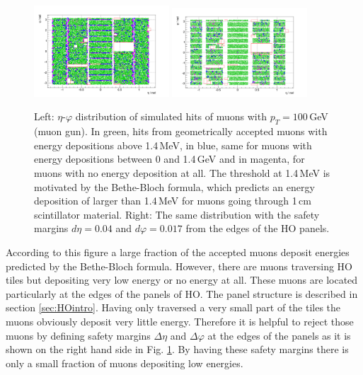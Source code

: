 			\begin{figure}[htbp]
				\centering
				\includegraphics[width=0.45\textwidth]{Figures/erdogan/simhits_wo_deta_dphi.png}
				\includegraphics[width=0.45\textwidth]{Figures/erdogan/simhits_with_deta_dphi.png}
				\caption{Left: $\eta$-$\varphi$ distribution of simulated hits of muons with $p_T = 100$\,GeV (muon gun). In green, hits from geometrically accepted muons with energy depositions above 1.4\,MeV, in
				blue, same for muons with energy depositions between 0 and 1.4\,GeV and in magenta, for muons with no energy deposition at all. The threshold at 1.4\,MeV is motivated by the Bethe-Bloch formula,
				which predicts an energy deposition of larger than 1.4\,MeV for muons going through 1\,cm scintillator material. Right: The same distribution with the safety margins $d\eta = 0.04$ and
				$d\varphi = 0.017$ from the edges of the HO panels.}
				\label{fig:simhits_in_acceptance}
			\end{figure}
			According to this figure a large fraction of the accepted muons deposit energies predicted by the Bethe-Bloch formula.
			However, there are muons traversing HO tiles but depositing very low energy or no energy at all.
			These muons are located particularly at the edges of the panels of HO.
			The panel structure is described in section \ref{sec:HOintro}.
			Having only traversed a very small part of the tiles the muons obviously deposit very little energy.
			Therefore it is helpful to reject those muons by defining safety margins $\Delta\eta$ and $\Delta\varphi$ at the edges of the panels as it is shown on the right hand side in Fig.
			\ref{fig:simhits_in_acceptance}.
			By having these safety margins there is only a small fraction of muons depositing low energies.
